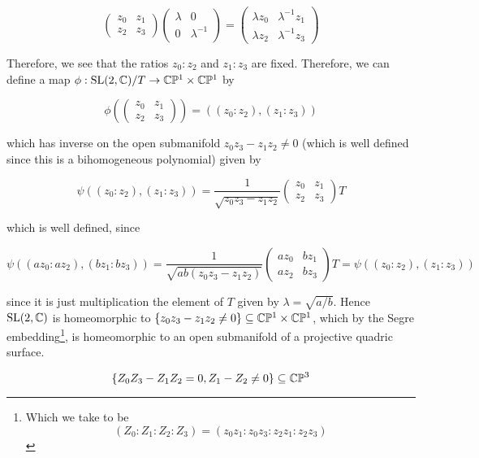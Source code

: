 \documentclass{article}
\begin{document}
\[\begin{pmatrix}
    z_0 & z_1 \\ z_2 & z_3
\end{pmatrix}\begin{pmatrix}
    \lambda & 0 \\ 0 & \lambda^{-1}
\end{pmatrix} = \begin{pmatrix}
    \lambda z_0 & \lambda^{-1}z_1 \\ \lambda z_2 & \lambda^{-1}z_3
\end{pmatrix}\]

Therefore, we see that the ratios \(z_0 : z_2\) and \(z_1 : z_3\) are fixed. Therefore, we can define a map \(\phi : \operatorname{SL}(2, \mathbb{C})/T \to \mathbb{C}\mathbb{P}^1 \times \mathbb{C}\mathbb{P}^1\) by

\[\phi\left(\begin{pmatrix}
    z_0 & z_1 \\ z_2 & z_3
\end{pmatrix}\right) = ((z_0 : z_2), (z_1 : z_3))\]

which has inverse on the open submanifold \(z_0z_3 - z_1z_2 \ne 0\) (which is well defined since this is a bihomogeneous polynomial) given by

\[\psi((z_0:z_2), (z_1:z_3)) = \frac{1}{\sqrt{z_0z_3 - z_1z_2}}\begin{pmatrix}
    z_0 & z_1 \\ z_2 & z_3
\end{pmatrix}T\]

which is well defined, since

\[\psi((az_0:az_2),(bz_1:bz_3)) = \frac{1}{\sqrt{ab(z_0z_3 - z_1z_2)}}\begin{pmatrix}
    az_0 & bz_1 \\ az_2 & bz_3
\end{pmatrix}T = \psi((z_0:z_2), (z_1:z_3))\]

since it is just multiplication the element of \(T\) given by \(\lambda = \sqrt{a/b}\). Hence \(\operatorname{SL}(2, \mathbb{C})\) is homeomorphic to \(\{z_0z_3 - z_1z_2 \ne 0\} \subseteq \mathbb{C}\mathbb{P}^1 \times \mathbb{C}\mathbb{P}^1\), which by the Segre embedding\footnote{Which we take to be \[(Z_0:Z_1:Z_2:Z_3) = (z_0z_1:z_0z_3:z_2z_1:z_2z_3)\]}, is homeomorphic to an open submanifold of a projective quadric surface.

\[\{Z_0Z_3 - Z_1Z_2 = 0, Z_1 - Z_2 \ne 0\} \subseteq \mathbb{C} \mathbb{P}^3\]
\end{document}
